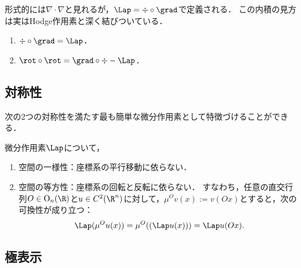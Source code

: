 \documentclass[uplatex,dvipdfmx]{jsreport}
\begin{document}
\begin{tcolorbox}[colframe=ForestGreen, colback=ForestGreen!10!white,breakable,colbacktitle=ForestGreen!40!white,coltitle=black,fonttitle=\bfseries\sffamily,
    title=]
    形式的には$\nabla\cdot\nabla$と見れるが，$\Lap=\div\circ\grad$で定義される．
    この内積の見方は実はHodge作用素と深く結びついている．
\end{tcolorbox}

\begin{proposition}\mbox{}\label{prop-Laplace-operator}
    \begin{enumerate}
        \item $\div\circ\grad=\Lap$．
        \item $\rot\circ\rot=\grad\circ\div-\Lap$．
    \end{enumerate}
\end{proposition}

\subsection{対称性}

\begin{tcolorbox}[colframe=ForestGreen, colback=ForestGreen!10!white,breakable,colbacktitle=ForestGreen!40!white,coltitle=black,fonttitle=\bfseries\sffamily,
title=]
    次の2つの対称性を満たす最も簡単な微分作用素として特徴づけることができる．
\end{tcolorbox}

\begin{lemma}
    微分作用素$\Lap$について，
    \begin{enumerate}
        \item 空間の一様性：座標系の平行移動に依らない．
        \item 空間の等方性：座標系の回転と反転に依らない．
        すなわち，任意の直交行列$O\in\mathrm{O}_n(\R)$と$u\in C^2(\R^n)$に対して，$\mu^O v(x):=v(Ox)$とすると，次の可換性が成り立つ：
        \[\Lap(\mu^Ou(x))=\mu^O((\Lap u(x)))=\Lap u(Ox).\]
    \end{enumerate}
\end{lemma}

\subsection{極表示}
\end{document}
